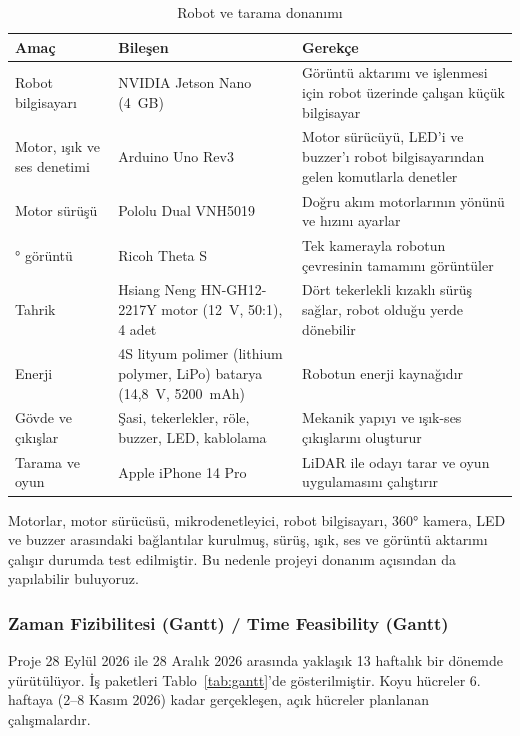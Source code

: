 \documentclass[11pt,a4paper]{article}
\begin{document}
\begin{table}[H]
\centering
\caption{Robot ve tarama donanımı}
\label{tab:donanim_maliyet}
\small
\begin{tabularx}{\linewidth}{>{\raggedright\arraybackslash}p{2.6cm} >{\raggedright\arraybackslash}p{4.3cm} >{\raggedright\arraybackslash}X}
\toprule
\textbf{Amaç} & \textbf{Bileşen} & \textbf{Gerekçe} \\
\midrule
Robot bilgisayarı & NVIDIA Jetson Nano (4~GB) & Görüntü aktarımı ve işlenmesi için robot üzerinde çalışan küçük bilgisayar \\
Motor, ışık ve ses denetimi & Arduino Uno Rev3 & Motor sürücüyü, LED'i ve buzzer'ı robot bilgisayarından gelen komutlarla denetler \\
Motor sürüşü & Pololu Dual VNH5019 & Doğru akım motorlarının yönünü ve hızını ayarlar \\
360° görüntü & Ricoh Theta S & Tek kamerayla robotun çevresinin tamamını görüntüler \\
Tahrik & Hsiang Neng HN-GH12-2217Y motor (12~V, 50:1), 4 adet & Dört tekerlekli kızaklı sürüş sağlar, robot olduğu yerde dönebilir \\
Enerji & 4S lityum polimer (lithium polymer, LiPo) batarya (14,8~V, 5200~mAh) & Robotun enerji kaynağıdır \\
Gövde ve çıkışlar & Şasi, tekerlekler, röle, buzzer, LED, kablolama & Mekanik yapıyı ve ışık-ses çıkışlarını oluşturur \\
Tarama ve oyun & Apple iPhone 14 Pro & LiDAR ile odayı tarar ve oyun uygulamasını çalıştırır \\
\bottomrule
\end{tabularx}
\end{table}

Motorlar, motor sürücüsü, mikrodenetleyici, robot bilgisayarı, 360° kamera, LED ve buzzer arasındaki bağlantılar kurulmuş, sürüş, ışık, ses ve görüntü aktarımı çalışır durumda test edilmiştir. Bu nedenle projeyi donanım açısından da yapılabilir buluyoruz.

\subsubsection{Zaman Fizibilitesi (Gantt) / Time Feasibility (Gantt)}
\label{subsubsec:zaman_fizibilitesi}
Proje 28 Eylül 2026 ile 28 Aralık 2026 arasında yaklaşık 13 haftalık bir dönemde yürütülüyor. İş paketleri Tablo~\ref{tab:gantt}'de gösterilmiştir. Koyu hücreler 6. haftaya (2--8 Kasım 2026) kadar gerçekleşen, açık hücreler planlanan çalışmalardır.
\end{document}
